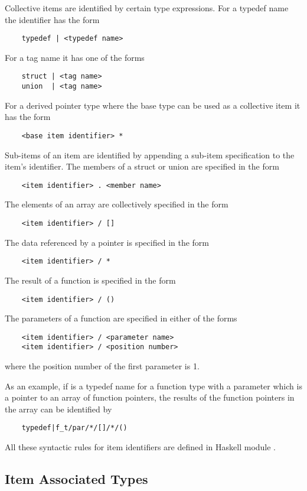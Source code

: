 Collective items are identified by certain type expressions. For a typedef name the identifier has the form
\begin{verbatim}
    typedef | <typedef name>
\end{verbatim}
For a tag name it has one of the forms
\begin{verbatim}
    struct | <tag name>
    union  | <tag name>
\end{verbatim}
For a derived pointer type where the base type can be used as a collective item it has the form
\begin{verbatim}
    <base item identifier> *
\end{verbatim}

Sub-items of an item are identified by appending a sub-item specification to the item's identifier.
The members of a struct or union are specified in the form
\begin{verbatim}
    <item identifier> . <member name>
\end{verbatim}
The elements of an array are collectively specified in the form
\begin{verbatim}
    <item identifier> / []
\end{verbatim}
The data referenced by a pointer is specified in the form
\begin{verbatim}
    <item identifier> / *
\end{verbatim}
The result of a function is specified in the form
\begin{verbatim}
    <item identifier> / ()
\end{verbatim}
The parameters of a function are specified in either of the forms
\begin{verbatim}
    <item identifier> / <parameter name>
    <item identifier> / <position number>
\end{verbatim}
where the position number of the first parameter is 1.

As an example, if  is a typedef name for a function type with a parameter  
which is a pointer to an array of function pointers, the results of the function pointers in the
array can be identified by 
\begin{verbatim}
    typedef|f_t/par/*/[]/*/()
\end{verbatim}

All these syntactic rules for item identifiers are defined in Haskell module .

\subsection{Item Associated Types}
\label{impl-itemprops-types}

